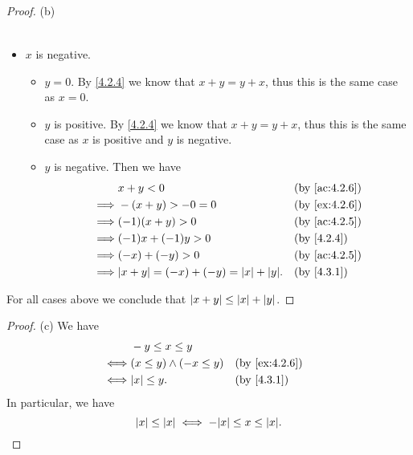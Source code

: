\begin{proof}{(b)}
\begin{itemize}
\begin{itemize}
\begin{itemize}
\begin{align*}
                          \end{align*}
                  \end{itemize}
          \end{itemize}
    \item \(x\) is negative.
          \begin{itemize}
            \item \(y = 0\).
                  By \cref{4.2.4} we know that \(x + y = y + x\), thus this is the same case as \(x = 0\).
            \item \(y\) is positive.
                  By \cref{4.2.4} we know that \(x + y = y + x\), thus this is the same case as \(x\) is positive and \(y\) is negative.
            \item \(y\) is negative.
                  Then we have
                  \begin{align*}
                             & x + y < 0                                      &  & \by{ac:4.2.6} \\
                    \implies & -(x + y) > -0 = 0                              &  & \by{ex:4.2.6} \\
                    \implies & (-1)(x + y) > 0                                &  & \by{ac:4.2.5} \\
                    \implies & (-1)x + (-1)y > 0                              &  & \by{4.2.4}    \\
                    \implies & (-x) + (-y) > 0                                &  & \by{ac:4.2.5} \\
                    \implies & \abs{x + y} = (-x) + (-y) = \abs{x} + \abs{y}. &  & \by{4.3.1}
                  \end{align*}
          \end{itemize}
  \end{itemize}
  For all cases above we conclude that \(\left\lvert x + y\right\rvert \leq \left\lvert x\right\rvert + \left\lvert y\right\rvert\).
\end{proof}

\begin{proof}{(c)}
  We have
  \begin{align*}
         & -y \leq x \leq y                                \\
    \iff & (x \leq y) \land (-x \leq y) &  & \by{ex:4.2.6} \\
    \iff & \abs{x} \leq y.              &  & \by{4.3.1}
  \end{align*}
  In particular, we have
  \[
    \abs{x} \leq \abs{x} \iff -\abs{x} \leq x \leq \abs{x}.
  \]
\end{proof}

